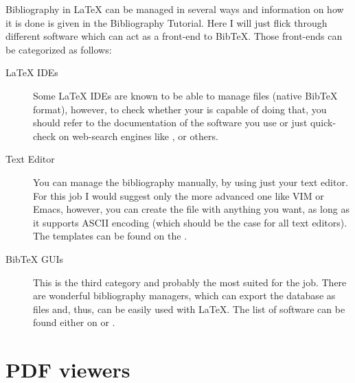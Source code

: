 \documentclass[
    draft
]{scrartcl}
\begin{document}
%
Bibliography in \LaTeX{} can be managed in several ways and information on how it
    is done is given in the Bibliography Tutorial.
%
Here I will just flick through different software which can act as a front-end
    to Bib\TeX{}.
%
Those front-ends can be categorized as follows:
%
\begin{description}
    \item[\LaTeX{} IDEs]
        Some \LaTeX{} IDEs are known to be able to manage  files
            (native Bib\TeX{} format), however, to check whether your is capable
            of doing that, you should refer to the documentation of the software
            you use or just quick-check on web-search engines like
            ,
             or others.
    \item[Text Editor]
        You can manage the bibliography manually, by using just your text
            editor.
        For this job I would suggest only the more advanced one like VIM or
            Emacs, however, you can create the  file with anything
            you want, as long as it supports ASCII encoding (which should be the
            case for all text editors).
        The templates can be found on the
            .
    \item[Bib\TeX{} GUIs]
        This is the third category and probably the most suited for the job.
        There are wonderful bibliography managers, which can export the database
            as  files and, thus, can be easily used with \LaTeX{}.
        The list of software can be found either on 
            or
            .
\end{description}

\section{PDF viewers}
\end{document}
